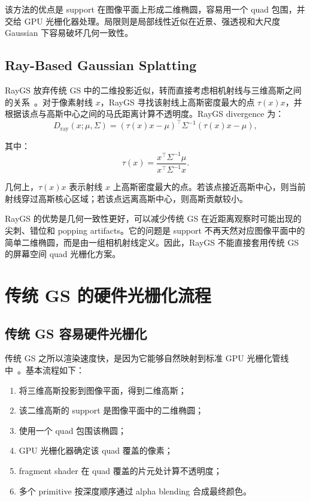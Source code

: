 \documentclass[12pt,hyperref,a4paper,UTF8]{ctexart}
\begin{document}
该方法的优点是 support 在图像平面上形成二维椭圆，容易用一个 quad 包围，并交给 GPU 光栅化器处理。局限则是局部线性近似在近景、强透视和大尺度 Gaussian 下容易破坏几何一致性。



\subsection{Ray-Based Gaussian Splatting}
RayGS 放弃传统 GS 中的二维投影近似，转而直接考虑相机射线与三维高斯之间的关系~\cite{gaussianopacityfields}。对于像素射线 $x$，RayGS 寻找该射线上高斯密度最大的点 $\tau(x)x$，并根据该点与高斯中心之间的马氏距离计算不透明度。RayGS divergence 为：
\begin{equation}
\displaystyle
D_{\mathrm{ray}}(x;\mu,\Sigma)
=
\left(\tau(x)x-\mu\right)^\top
\Sigma^{-1}
\left(\tau(x)x-\mu\right),
\end{equation}

其中：
\begin{equation}
\displaystyle
\tau(x)
=
\frac{x^\top \Sigma^{-1}\mu}
{x^\top \Sigma^{-1}x}.
\end{equation}

几何上，$\tau(x)x$ 表示射线 $x$ 上高斯密度最大的点。若该点接近高斯中心，则当前射线穿过高斯核心区域；若该点远离高斯中心，则高斯贡献较小。

RayGS 的优势是几何一致性更好，可以减少传统 GS 在近距离观察时可能出现的尖刺、错位和 popping artifacts。它的问题是 support 不再天然对应图像平面中的简单二维椭圆，而是由一组相机射线定义。因此，RayGS 不能直接套用传统 GS 的屏幕空间 quad 光栅化方案。



\section{传统 GS 的硬件光栅化流程}
\subsection{传统 GS 容易硬件光栅化}
传统 GS 之所以渲染速度快，是因为它能够自然映射到标准 GPU 光栅化管线中~\cite{3dgaussiansplatting,vkgs}。基本流程如下：

\begin{enumerate}
    \item 将三维高斯投影到图像平面，得到二维高斯；
    \item 该二维高斯的 support 是图像平面中的二维椭圆；
    \item 使用一个 quad 包围该椭圆；
    \item GPU 光栅化器确定该 quad 覆盖的像素；
    \item fragment shader 在 quad 覆盖的片元处计算不透明度；
    \item 多个 primitive 按深度顺序通过 alpha blending 合成最终颜色。
\end{enumerate}
\end{document}
